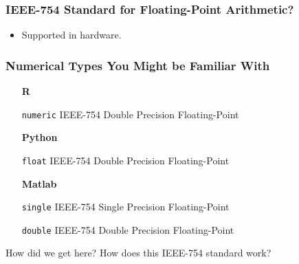 \begin{frame}

\frametitle{IEEE-754 Standard for Floating-Point Arithmetic?}

\begin{itemize}

\item Supported in hardware.

\end{itemize}

\end{frame}


\begin{frame}

\frametitle{Numerical Types You Might be Familiar With}

\begin{itemize}

\item[\textbf{R}] \hfill\\

\item[\texttt{numeric}] IEEE-754 Double Precision Floating-Point

\item[\textbf{Python}] \hfill\\

\item[\texttt{float}] IEEE-754 Double Precision Floating-Point

\item[\textbf{Matlab}] \hfill\\

\item[\texttt{single}] IEEE-754 Single Precision Floating-Point

\item[\texttt{double}] IEEE-754 Double Precision Floating-Point

\end{itemize}

\begin{center}

How did we get here? How does this IEEE-754 standard work?

\end{center}

\end{frame}
